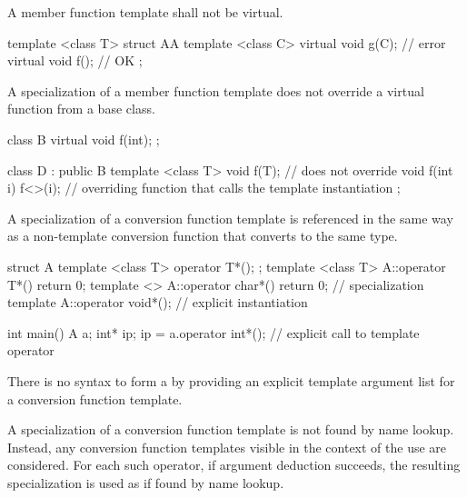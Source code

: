 \pnum
A member function template shall not be virtual.
\begin{example}
\begin{codeblock}
template <class T> struct AA {
  template <class C> virtual void g(C);             // error
  virtual void f();                                 // OK
};
\end{codeblock}
\end{example}

\pnum
A specialization of
a member function template does not override a virtual function from a
base class.
\begin{example}
\begin{codeblock}
class B {
  virtual void f(int);
};

class D : public B {
  template <class T> void f(T); // does not override 
  void f(int i) { f<>(i); }     // overriding function that calls the template instantiation
};
\end{codeblock}
\end{example}

\pnum
A specialization of a
conversion function template
is referenced in
the same way as a non-template conversion function that converts to
the same type.
\begin{example}
\begin{codeblock}
struct A {
  template <class T> operator T*();
};
template <class T> A::operator T*(){ return 0; }
template <> A::operator char*(){ return 0; }        // specialization
template A::operator void*();                       // explicit instantiation

int main() {
  A a;
  int* ip;
  ip = a.operator int*();       // explicit call to template operator 
}
\end{codeblock}
\end{example}
\begin{note}
There is no syntax to form a 
by providing an explicit template argument list
for a conversion function template.
\end{note}

\pnum
A specialization of a
conversion function template
is not found by name
lookup.
Instead, any
conversion function templates
visible in the
context of the use are considered.
For each such operator, if argument
deduction succeeds, the resulting specialization is
used as if found by name lookup.

